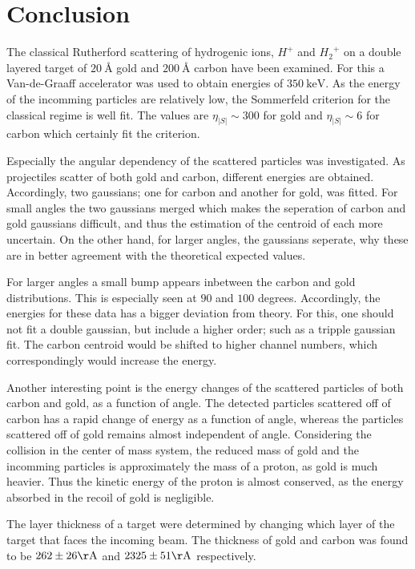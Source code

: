 \section{Conclusion}
The classical Rutherford scattering of hydrogenic ions, $H^+$ and ${H_2}^+$ on
a double layered target of $\SI{20}{\angstrom}$ gold and $\SI{200}{\angstrom}$
carbon have been examined.
For this a Van-de-Graaff accelerator was used to obtain energies of
$\SI{350}{\kilo\electronvolt}$. As the energy of the incomming particles are
relatively low, the Sommerfeld criterion for the classical regime is well fit.
The values are $\eta_|S| \sim 300$ for gold and $\eta_|S| \sim 6$ for carbon
which certainly fit the criterion.

Especially the angular dependency of the scattered particles was investigated.
As projectiles scatter of both gold and carbon, different energies are
obtained. Accordingly, two gaussians; one for carbon and another for gold, was
fitted. For small angles the two gaussians merged which makes the seperation of
carbon and gold gaussians difficult, and thus the estimation of the centroid of
each more uncertain. On the other hand, for larger angles, the gaussians
seperate, why these are in better agreement with the theoretical expected
values.

For larger angles a small bump appears inbetween the carbon and gold
distributions. This is especially seen at $90$ and $100$ degrees. Accordingly,
the energies for these data has a bigger deviation from theory. For this, one
should not fit a double gaussian, but include a higher order; such as a tripple
gaussian fit. The carbon centroid would be shifted to higher channel numbers,
which correspondingly would increase the energy. 

Another interesting point is the energy changes of the scattered particles of
both carbon and gold, as a function of angle. The detected particles scattered
off of carbon has a rapid change of energy as a function of angle, whereas the
particles scattered off of gold remains almost independent of angle.
Considering the collision in the center of mass system, the reduced mass of
gold and the incomming particles is approximately the mass of a proton, as gold
is much heavier. Thus the kinetic energy of the proton is almost conserved, as
the energy absorbed in the recoil of gold is negligible. 

The layer thickness of a target were determined by changing which layer of the target that faces the incoming beam. The thickness of gold and carbon was found to be $262\pm26\si{\AA}$ and $2325\pm51\si{\AA}$ respectively. 

\vfill

